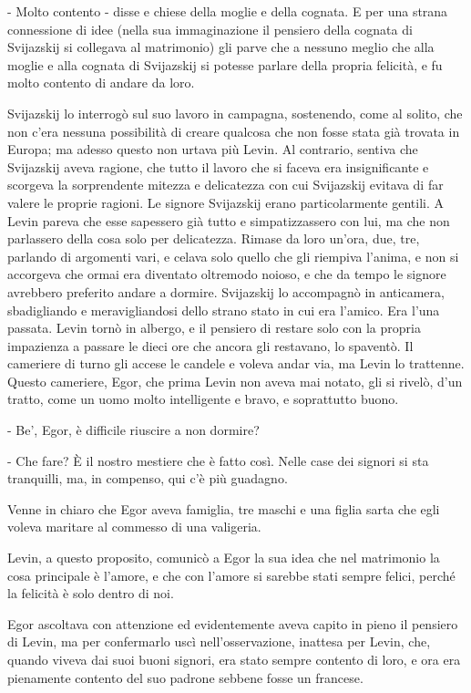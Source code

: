 - Molto contento - disse e chiese della moglie e della cognata. E per una strana connessione di idee (nella sua immaginazione il pensiero della cognata di Svijazskij si collegava al matrimonio) gli parve che a nessuno meglio che alla moglie e alla cognata di Svijazskij si potesse parlare della propria felicità, e fu molto contento di andare da loro. 

Svijazskij lo interrogò sul suo lavoro in campagna, sostenendo, come al solito, che non c'era nessuna possibilità di creare qualcosa che non fosse stata già trovata in Europa; ma adesso questo non urtava più Levin. Al contrario, sentiva che Svijazskij aveva ragione, che tutto il lavoro che si faceva era insignificante e scorgeva la sorprendente mitezza e delicatezza con cui Svijazskij evitava di far valere le proprie ragioni. Le signore Svijazskij erano particolarmente gentili. A Levin pareva che esse sapessero già tutto e simpatizzassero con lui, ma che non parlassero della cosa solo per delicatezza. Rimase da loro un'ora, due, tre, parlando di argomenti vari, e celava solo quello che gli riempiva l'anima, e non si accorgeva che ormai era diventato oltremodo noioso, e che da tempo le signore avrebbero preferito andare a dormire. Svijazskij lo accompagnò in anticamera, sbadigliando e meravigliandosi dello strano stato in cui era l'amico. Era l'una passata. Levin tornò in albergo, e il pensiero di restare solo con la propria impazienza a passare le dieci ore che ancora gli restavano, lo spaventò. Il cameriere di turno gli accese le candele e voleva andar via, ma Levin lo trattenne. Questo cameriere, Egor, che prima Levin non aveva mai notato, gli si rivelò, d'un tratto, come un uomo molto intelligente e bravo, e soprattutto buono. 

- Be', Egor, è difficile riuscire a non dormire? 

- Che fare? È il nostro mestiere che è fatto così. Nelle case dei signori si sta tranquilli, ma, in compenso, qui c'è più guadagno. 

Venne in chiaro che Egor aveva famiglia, tre maschi e una figlia sarta che egli voleva maritare al commesso di una valigeria. 

Levin, a questo proposito, comunicò a Egor la sua idea che nel matrimonio la cosa principale è l'amore, e che con l'amore si sarebbe stati sempre felici, perché la felicità è solo dentro di noi. 

Egor ascoltava con attenzione ed evidentemente aveva capito in pieno il pensiero di Levin, ma per confermarlo uscì nell'osservazione, inattesa per Levin, che, quando viveva dai suoi buoni signori, era stato sempre contento di loro, e ora era pienamente contento del suo padrone sebbene fosse un francese. 

